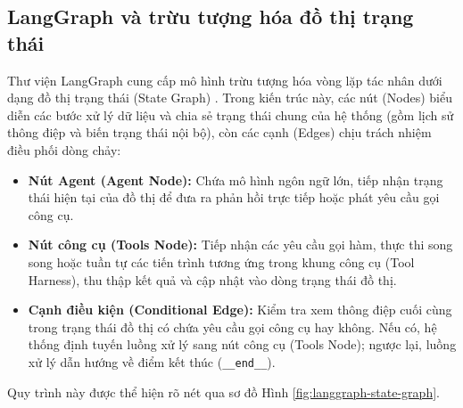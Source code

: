 \subsection{LangGraph và trừu tượng hóa đồ thị trạng thái}
Thư viện LangGraph cung cấp mô hình trừu tượng hóa vòng lặp tác nhân dưới dạng đồ thị trạng thái (State Graph) \cite{langgraphDocs}. Trong kiến trúc này, các nút (Nodes) biểu diễn các bước xử lý dữ liệu và chia sẻ trạng thái chung của hệ thống (gồm lịch sử thông điệp và biến trạng thái nội bộ), còn các cạnh (Edges) chịu trách nhiệm điều phối dòng chảy:
\begin{itemize}
  \item \textbf{Nút Agent (Agent Node):} Chứa mô hình ngôn ngữ lớn, tiếp nhận trạng thái hiện tại của đồ thị để đưa ra phản hồi trực tiếp hoặc phát yêu cầu gọi công cụ.
  \item \textbf{Nút công cụ (Tools Node):} Tiếp nhận các yêu cầu gọi hàm, thực thi song song hoặc tuần tự các tiến trình tương ứng trong khung công cụ (Tool Harness), thu thập kết quả và cập nhật vào dòng trạng thái đồ thị.
  \item \textbf{Cạnh điều kiện (Conditional Edge):} Kiểm tra xem thông điệp cuối cùng trong trạng thái đồ thị có chứa yêu cầu gọi công cụ hay không. Nếu có, hệ thống định tuyến luồng xử lý sang nút công cụ (Tools Node); ngược lại, luồng xử lý dẫn hướng về điểm kết thúc (\texttt{\_\_end\_\_}).
\end{itemize}
Quy trình này được thể hiện rõ nét qua sơ đồ Hình \ref{fig:langgraph-state-graph}.

